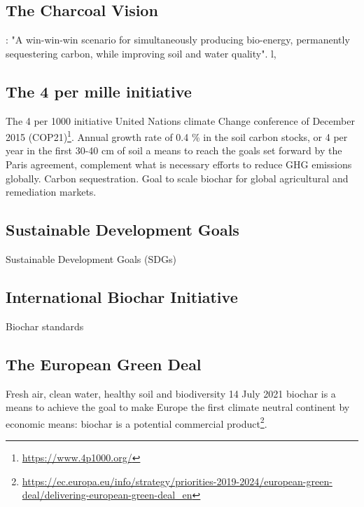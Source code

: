 \subsection{The Charcoal Vision}
\citep{Laird2008}: "A win-win-win scenario for simultaneously producing bio-energy, permanently sequestering carbon, while improving soil and water quality". l, 

\subsection{The 4 per mille initiative}
The 4 per 1000 initiative United Nations climate Change conference of December 2015 (COP21)\footnote{\url{https://www.4p1000.org/}}. Annual growth rate of 0.4 \% in the soil carbon stocks, or 4 \textperthousand  per year in the first 30-40 cm of soil a means to reach the goals set forward by the Paris agreement, complement what is necessary efforts to reduce GHG emissions globally. Carbon sequestration. Goal to scale biochar for global agricultural and remediation markets. 

\subsection{Sustainable Development Goals}
Sustainable Development Goals (SDGs)

\subsection{International Biochar Initiative}
Biochar standards

\subsection{The European Green Deal}
Fresh air, clean water, healthy soil and biodiversity
14 July 2021 biochar is a means to achieve the goal to make Europe the first climate neutral continent by economic means: biochar is a potential commercial product\footnote{\url{https://ec.europa.eu/info/strategy/priorities-2019-2024/european-green-deal/delivering-european-green-deal_en}}.







